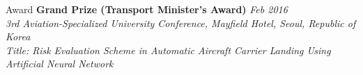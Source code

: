\documentclass{resume} %
\begin{document}
%
%
%
%
%
%
\begin{rSection}{Award}
{\bf Grand Prize (Transport Minister's Award)} \hfill {\em Feb 2016} \\ 
\textit{3rd Aviation-Specialized University Conference, Mayfield Hotel, Seoul, Republic of Korea} \\
\textit{Title: Risk Evaluation Scheme in Automatic Aircraft Carrier Landing Using Artificial Neural Network}

\end{rSection}





\end{document}
